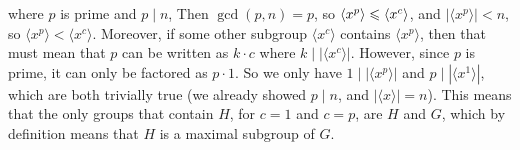 \documentclass[12pt]{article}
\begin{document}
\begin{enumerate}[label=\textbf{\alph*.}]
            where $p$ is prime and $p \mid n$,
            Then $\gcd(p, n) = p$,
            so $\langle x^p \rangle \leqslant \langle x^c \rangle$,
            and $|\langle x^p \rangle| < n$,
            so $\langle x^p \rangle < \langle x^c \rangle$.
            Moreover, if some other subgroup $\langle x^c \rangle$
            contains  $\langle x^p \rangle$,
            then that must mean that $p$ can be written
            as $k \cdot c$ where $k \mid |\langle x^c \rangle|$.
            However, since $p$ is prime,
            it can only be factored as $p \cdot 1$.
            So we only have $1 \mid |\langle x^p \rangle|$
            and $p \mid |\langle x^1 \rangle|$,
            which are both trivially true
            (we already showed $p \mid n$, and $|\langle x \rangle| = n$).
            This means that the only groups that contain $H$,
            for $c = 1$ and $c = p$, are $H$ and $G$,
            which by definition means that $H$ is a maximal subgroup of $G$.
    \end{enumerate}
\end{document}
